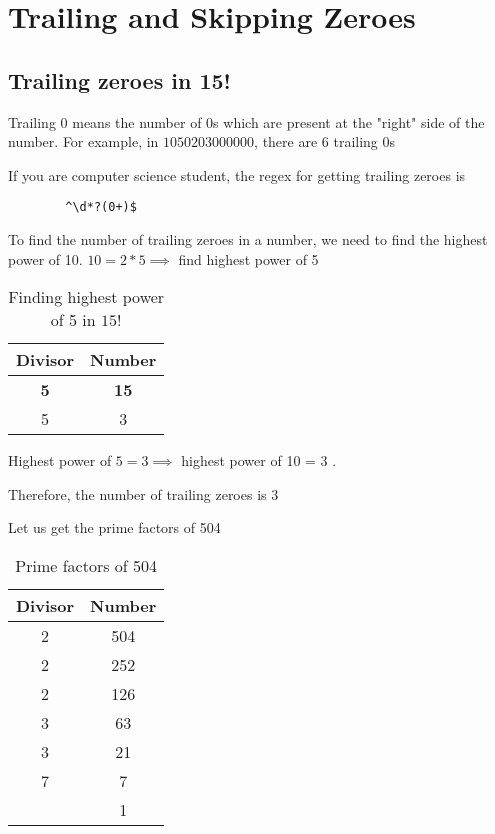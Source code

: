 \section{Trailing and Skipping Zeroes}

\subsection{Trailing zeroes in 15!}

Trailing 0 means the number of 0s which are present at the "right" side of the number. For example, in $1050203000000$, there are 6 trailing 0s

\begin{NOTE}
    If you are computer science student, the regex for getting trailing zeroes is 
    \begin{verbatim} 
        ^\d*?(0+)$ 
    \end{verbatim}
\end{NOTE}

To find the number of trailing zeroes in a number, we need to find the highest power of 10. $10 = 2 * 5 \implies$ find highest power of 5

\begin{table}[ht!]
    \centering
    \begin{tabular}{|| c | c ||}
         \hline
         Divisor & Number  \\
         \hline
         \textbf{5} & \textbf{15} \\
         5 & 3 \\
         \hline
    \end{tabular}
    \caption{Finding highest power of 5 in $15!$}
\end{table}

Highest power of $5 = 3 \implies$ highest power of 10 = 3 .

Therefore, the number of trailing zeroes is 3

\newpage


Let us get the prime factors of 504

\begin{table}[ht!]
    \centering
    \begin{tabular}{|| c | c ||}
         \hline
         Divisor & Number  \\
         \hline
         2 & 504 \\
         2 & 252 \\
         2 & 126 \\
         3 & 63 \\
         3 & 21 \\
         7 & 7 \\
           & 1 \\
         \hline
    \end{tabular}
    \caption{Prime factors of 504}
\end{table}

